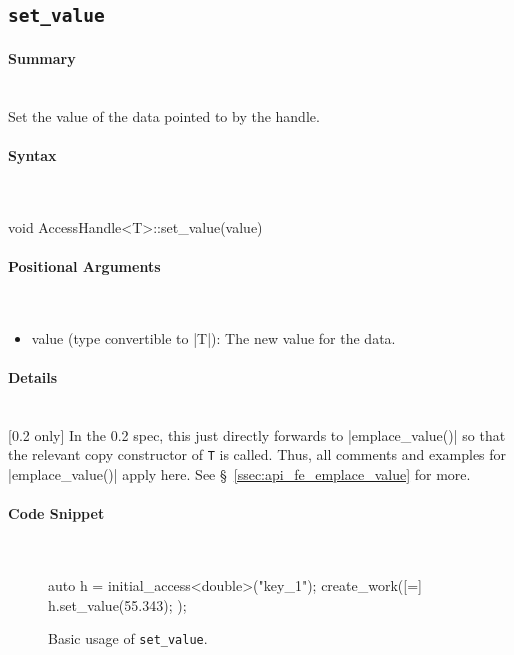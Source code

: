 \subsection{\texttt{set\_value}}

\paragraph{Summary} \mbox{}\\
Set the value of the data pointed to by the handle.

\paragraph{Syntax} \mbox{}\\
\begin{CppCode}
void AccessHandle<T>::set_value(value)
\end{CppCode}

\paragraph{Positional Arguments}\mbox{}\\
\begin{itemize}
  \item value (type convertible to |T|): The new value for the data.
\end{itemize}

\paragraph{Details}\mbox{}\\
{\color{red}[0.2 only]} In the 0.2 spec, this just directly forwards to
|emplace_value()| so that the relevant copy constructor of {\tt T} is
called.  Thus, all comments and examples for |emplace_value()| apply
here.  See \S~\ref{ssec:api_fe_emplace_value} for more.

\paragraph{Code Snippet}\mbox{}\\
\begin{figure}[!h]
\begin{CppCodeNumb}
auto h = initial_access<double>("key_1");
create_work([=]{
  h.set_value(55.343);
});
\end{CppCodeNumb}
\label{fig:fe_api_set_value}
\caption{Basic usage of \lstinline|set_value|.}
\end{figure}

